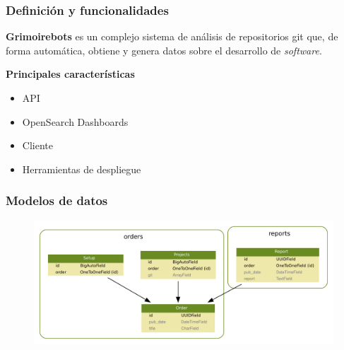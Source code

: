 \documentclass[
	11pt, %
	aspectratio=169, %
]{beamer}
\begin{document}
\begin{frame}
	\frametitle{Definición y funcionalidades}

	\textbf{Grimoirebots} es un complejo sistema de análisis de repositorios git que, de forma automática, obtiene y genera datos sobre el desarrollo de \emph{software}.

	\bigskip %

	\textbf{Principales características}
	\begin{itemize}
		\item API
		\item OpenSearch Dashboards
		\item Cliente
		\item Herramientas de despliegue
	\end{itemize}
\end{frame}


\begin{frame}
	\frametitle{Modelos de datos}

	\begin{figure}
		\includegraphics[width=0.8\linewidth]{grimoirebots_models.pdf}
	\end{figure}
\end{frame}

\end{document}
